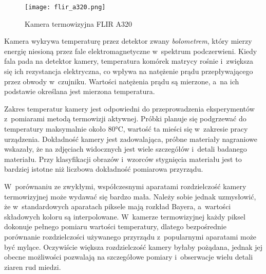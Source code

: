 \begin{figure}[h]
    \centering
    \texttt{[image: flir\_a320.png]}
    \caption{Kamera termowizyjna FLIR A320}
    \label{fig:camera}
\end{figure}

Kamera wykrywa temperaturę przez detektor zwany \emph{bolometrem},
który mierzy energię niesioną przez fale elektromagnetyczne w~spektrum
podczerwieni.
Kiedy fala pada na detektor kamery, temperatura komórek matrycy rośnie
i~zwiększa się ich rezystancja elektryczna, co wpływa na natężenie prądu
przepływającego przez obwody w~czujniku.
Wartości natężenia prądu są mierzone, a~na ich podstawie określana jest
mierzona temperatura.

Zakres temperatur kamery jest odpowiedni do przeprowadzenia eksperymentów
z~pomiarami metodą termowizji aktywnej.
Próbki planuje się podgrzewać do temperatury maksymalnie około
\num{80}\si{\celsius}, wartość ta mieści się w~zakresie pracy urządzenia.
Dokładność kamery jest zadowalająca, próbne materiały nagraniowe
wskazały, że na zdjęciach widocznych jest wiele szczegółów i~detali
badanego materiału.
Przy klasyfikacji obrazów i~wzorców stygnięcia materiału jest to 
bardziej istotne niż liczbowa dokładność pomiarowa przyrządu.

W~porównaniu ze zwykłymi, współczesnymi aparatami rozdzielczość kamery
termowizyjnej może wydawać się bardzo mała.
Należy sobie jednak uzmysłowić, że w~standardowych aparatach piksele mają
rozkład Bayera, a~wartości składowych koloru są interpolowane.
W~kamerze termowizyjnej każdy piksel dokonuje pełnego pomiaru wartości
temperatury, dlatego bezpośrednie porównanie rozdzielczości używanego
przyrządu z~popularnymi aparatami może być mylące.
Oczywiście większa rozdzielczość kamery byłaby pożądana, jednak jej obecne
możliwości pozwalają na szczegółowe pomiary i~obserwacje wielu detali ziaren
rud miedzi.

